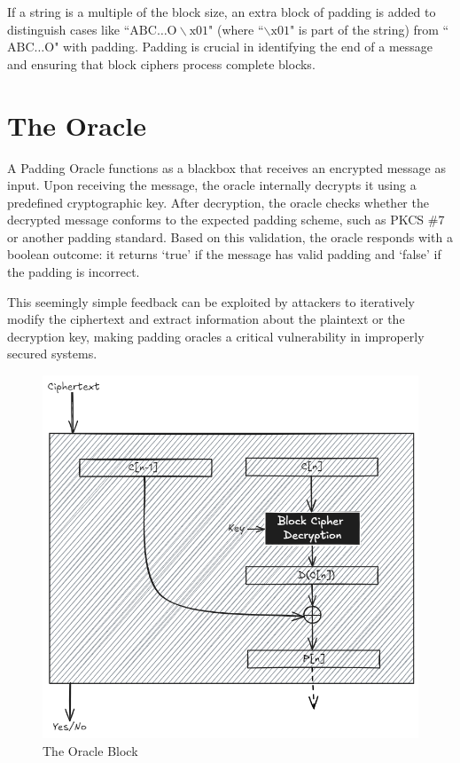 \documentclass[conference]{IEEEtran}
\begin{document}
If a string is a multiple of the block size, an extra block of padding is added to distinguish cases like ``$\text{ABC}\ldots\text{O}\backslash \text{x}01$" (where ``$\backslash \text{x}01$" is part of the string) from ``$\text{ABC}\ldots\text{O}$" with padding.
Padding is crucial in identifying the end of a message and ensuring that block ciphers process complete blocks.

\section{The Oracle}
A Padding Oracle functions as a blackbox that receives an encrypted message as input. Upon receiving the message, the oracle internally decrypts it using a predefined cryptographic key. After decryption, the oracle checks whether the decrypted message conforms to the expected padding scheme, such as PKCS \#7 or another padding standard. Based on this validation, the oracle responds with a boolean outcome: it returns `true' if the message has valid padding and `false' if the padding is incorrect. 

This seemingly simple feedback can be exploited by attackers to iteratively modify the ciphertext and extract information about the plaintext or the decryption key, making padding oracles a critical vulnerability in improperly secured systems.
\begin{figure}[!htb]
    \centering
    \includegraphics[width=0.8\linewidth]{oracle.png}
    \caption{The Oracle Block}
    \label{fig:oracle}
\end{figure}
\end{document}
